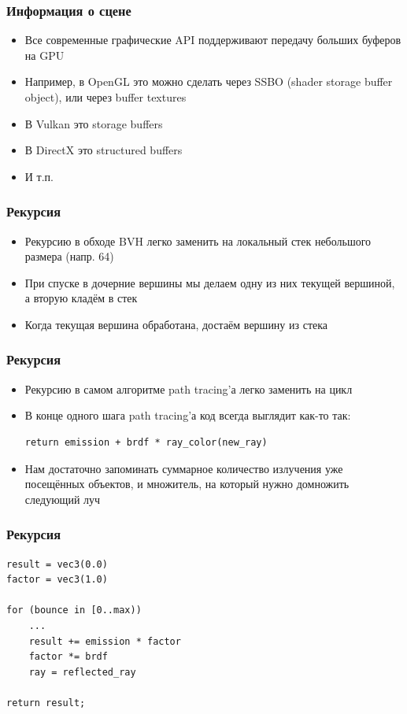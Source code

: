 \documentclass[10pt]{beamer}
\begin{document}
\begin{frame}[fragile]
\frametitle{Информация о сцене}
\begin{itemize}
\item Все современные графические API поддерживают передачу больших буферов на GPU
\pause
\item Например, в OpenGL это можно сделать через SSBO (shader storage buffer object), или через buffer textures
\pause
\item В Vulkan это storage buffers
\pause
\item В DirectX это structured buffers
\pause
\item И т.п.
\end{itemize}
\end{frame}

\begin{frame}[fragile]
\frametitle{Рекурсия}
\begin{itemize}
\item Рекурсию в обходе BVH легко заменить на локальный стек небольшого размера (напр. 64)
\pause
\item При спуске в дочерние вершины мы делаем одну из них текущей вершиной, а вторую кладём в стек
\pause
\item Когда текущая вершина обработана, достаём вершину из стека
\end{itemize}
\end{frame}

\begin{frame}[fragile]
\frametitle{Рекурсия}
\begin{itemize}
\item Рекурсию в самом алгоритме path tracing'а легко заменить на цикл
\pause
\item В конце одного шага path tracing'а код всегда выглядит как-то так:
\begin{verbatim}
return emission + brdf * ray_color(new_ray)
\end{verbatim}
\pause
\item Нам достаточно запоминать суммарное количество излучения уже посещённых объектов, и множитель, на который нужно домножить следующий луч
\end{itemize}
\end{frame}

\begin{frame}[fragile]
\frametitle{Рекурсия}
\begin{verbatim}
result = vec3(0.0)
factor = vec3(1.0)

for (bounce in [0..max))
    ...
    result += emission * factor
    factor *= brdf
    ray = reflected_ray

return result;
\end{verbatim}
\end{frame}
\end{document}
